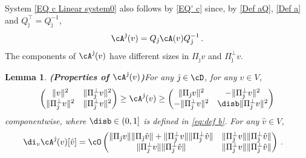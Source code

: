 \documentclass[11pt,a4paper,reqno]{article}
\numberwithin{equation}{section}
\newtheorem{lemma}[theorem]{Lemma}
\theoremstyle{definition}
\begin{document}
System \eqref{EQ c Linear system0} also follows by \eqref{EQ' c} since, by 
\eqref{Def aQ},  \eqref{Def a} and  
$ Q_{\hat \jmath}^\top = Q_{\hat \jmath}^{-1} $, 
\begin{equation}\label{coniugAQ}
\cA^{\hat \jmath}(v)=Q_{\hat \jmath}\cA(v)Q_{\hat \jmath}^{-1}\, .
\end{equation} 
The components of $ \cA^{\hat \jmath} (v)$ 
have  different sizes in $ \Pi_{\hat \jmath} v $  and 
 $ \Pi_{\hat \jmath}^\bot v $.  

    

    \begin{lemma}{\bf (Properties of $\cA^{\hat \jmath}(v) $)}\label{Properties of QaQT}
 For any  ${\hat \jmath} \in \cD$, for any $v\in V$, 
    \begin{equation}\label{Estimate on a(v,v)}
\left(\begin{matrix}
                \|v\|^2 & \| \Pi_{\hat \jmath}^\bot v \|^2 \\
                \|\Pi_{\hat \jmath}^\bot v \|^2 & \| \Pi_{\hat \jmath}^\bot v \|^2
            \end{matrix}\right)
\geq 
   \cA^{\hat \jmath} (v) \geq 
   \left(\begin{matrix}
                \|\Pi_{\hat \jmath} v\|^2 & -\| \Pi_{\hat \jmath}^\bot v \|^2 \\
                -\|\Pi_{\hat \jmath}^\bot v \|^2 &  \disb \| \Pi_{\hat \jmath}^\bot v \|^2
            \end{matrix}\right)        
        \end{equation}     
        componentwise, 
           where  $ \disb \in (0,1] $ is defined in \eqref{eq:def b}. 
        For any $ \hat v \in V $, 
\begin{align}\label{Estimates on d(A(v+w))}
            \di_v& \cA^{\hat \jmath} (v) [\hat v]=\cO\left(\begin{matrix}
                \|\Pi_{\hat \jmath} v\|\|\Pi_{\hat \jmath} \hat v\|+\|\Pi_{\hat \jmath}^\bot v\|\|\Pi_{\hat \jmath}^\bot \hat v\| & \| \Pi_{\hat \jmath}^\bot v \|\|\Pi_{\hat \jmath}^\bot \hat v\|\\
               \| \Pi_{\hat \jmath}^\bot v \|\|\Pi_{\hat \jmath}^\bot \hat v \| & \| \Pi_{\hat \jmath}^\bot v \|\|\Pi_{\hat \jmath}^\bot \hat v\|
            \end{matrix}\right) \, . 
        \end{align}
\end{lemma}
\end{document}
